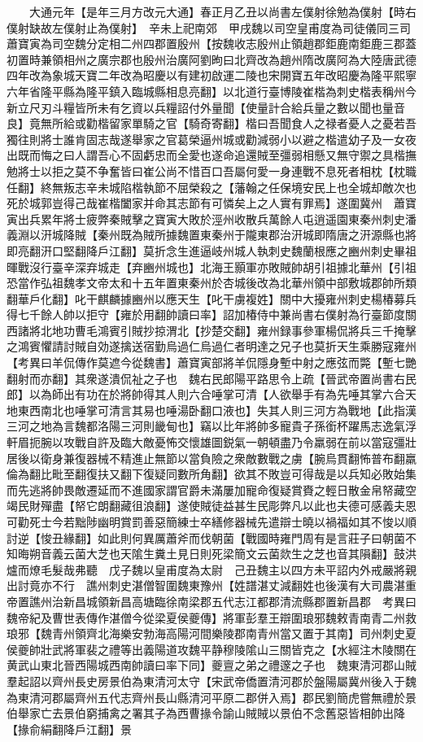 　　大通元年【是年三月方改元大通】春正月乙丑以尚書左僕射徐勉為僕射【時右僕射缺故左僕射止為僕射】　辛未上祀南郊　甲戌魏以司空皇甫度為司徒儀同三司蕭寶寅為司空魏分定相二州四郡置殷州【按魏收志殷州止領趙郡鉅鹿南鉅鹿三郡蓋初置時兼領相州之廣宗郡也殷州治廣阿劉昫曰北齊改為趙州隋改廣阿為大陸唐武德四年改為象城天寶二年改為昭慶以有建初啟運二陵也宋開寶五年改昭慶為隆平熙寧六年省隆平縣為隆平鎮入臨城縣相息亮翻】以北道行臺博陵崔楷為刺史楷表稱州今新立尺刃斗糧皆所未有乞資以兵糧詔付外量聞【使量計合給兵量之數以聞也量音良】竟無所給或勸楷留家單騎之官【騎奇寄翻】楷曰吾聞食人之禄者憂人之憂若吾獨往則將士誰肯固志哉遂舉家之官葛榮逼州城或勸減弱小以避之楷遣幼子及一女夜出既而悔之曰人謂吾心不固虧忠而全愛也遂命追還賊至彊弱相懸又無守禦之具楷撫勉將士以拒之莫不争奮皆曰崔公尚不惜百口吾屬何愛一身連戰不息死者相枕【枕職任翻】終無叛志辛未城陷楷執節不屈榮殺之【藩翰之任保境安民上也全城却敵次也死於城郭豈得己哉崔楷闔家并命其志節有可憐矣上之人實有罪焉】遂圍冀州　蕭寶寅出兵累年將士疲弊秦賊擊之寶寅大敗於涇州收散兵萬餘人屯逍遥園東秦州刺史潘義淵以汧城降賊【秦州既為賊所據魏置東秦州于隴東郡治汧城即隋唐之汧源縣也將即亮翻汧口堅翻降戶江翻】莫折念生進逼岐州城人執刺史魏蘭根應之豳州刺史畢祖暉戰沒行臺辛深弃城走【弃豳州城也】北海王顥軍亦敗賊帥胡引祖據北華州【引祖恐當作弘祖魏孝文帝太和十五年置東秦州於杏城後改為北華州領中部敷城郡帥所類翻華戶化翻】叱干麒麟據豳州以應天生【叱干虜複姓】關中大擾雍州刺史楊椿募兵得七千餘人帥以拒守【雍於用翻帥讀曰率】詔加椿侍中兼尚書右僕射為行臺節度關西諸將北地功曹毛鴻賓引賊抄掠渭北【抄楚交翻】雍州録事參軍楊侃將兵三千掩擊之鴻賓懼請討賊自効遂擒送宿勤烏過仁烏過仁者明達之兄子也莫折天生乘勝寇雍州　【考異曰羊侃傳作莫遮今從魏書】蕭寶寅部將羊侃隱身塹中射之應弦而斃【塹七艷翻射而亦翻】其衆遂潰侃祉之子也　魏右民郎陽平路思令上疏【晉武帝置尚書右民郎】以為師出有功在於將帥得其人則六合唾掌可清【人欲舉手有為先唾其掌六合天地東西南北也唾掌可清言其易也唾湯卧翻口液也】失其人則三河方為戰地【此指漢三河之地為言魏都洛陽三河則畿甸也】竊以比年將帥多寵貴子孫銜杯躍馬志逸氣浮軒眉扼腕以攻戰自許及臨大敵憂怖交懷雄圖鋭氣一朝頓盡乃令羸弱在前以當寇彊壯居後以衛身兼復器械不精進止無節以當負險之衆敵數戰之虜【腕烏貫翻怖普布翻羸倫為翻比毗至翻復扶又翻下復疑同數所角翻】欲其不敗豈可得哉是以兵知必敗始集而先逃將帥畏敵遷延而不進國家謂官爵未滿屢加寵命復疑賞賚之輕日散金帛帑藏空竭民財殫盡【帑它朗翻藏徂浪翻】遂使賊徒益甚生民彫弊凡以此也夫德可感義夫恩可勸死士今若黜陟幽明賞罰善惡簡練士卒繕修器械先遣辯士曉以禍福如其不悛以順討逆【悛丑緣翻】如此則何異厲蕭斧而伐朝菌【戰國時雍門周有是言莊子曰朝菌不知晦朔音義云菌大芝也天隂生糞土見日則死梁簡文云菌欻生之芝也音其隕翻】鼓洪爐而燎毛髮哉弗聽　戊子魏以皇甫度為太尉　己丑魏主以四方未平詔内外戒嚴將親出討竟亦不行　譙州刺史湛僧智圍魏東豫州【姓譜湛丈減翻姓也後漢有大司農湛重帝置譙州治新昌城領新昌高塘臨徐南梁郡五代志江都郡清流縣郡置新昌郡　考異曰魏帝紀及曹世表傳作湛僧今從梁夏侯夔傳】將軍彭羣王辯圍琅邪魏敕青南青二州救琅邪【魏青州領齊北海樂安勃海高陽河間樂陵郡南青州當又置于其南】司州刺史夏侯夔帥壯武將軍裴之禮等出義陽道攻魏平静穆陵隂山三關皆克之【水經注木陵關在黄武山東北晉西陽城西南帥讀曰率下同】夔亶之弟之禮邃之子也　魏東清河郡山賊羣起詔以齊州長史房景伯為東清河太守【宋武帝僑置清河郡於盤陽屬冀州後入于魏為東清河郡屬齊州五代志齊州長山縣清河平原二郡併入焉】郡民劉簡虎嘗無禮於景伯舉家亡去景伯窮捕禽之署其子為西曹掾令諭山賊賊以景伯不念舊惡皆相帥出降【掾俞絹翻降戶江翻】景